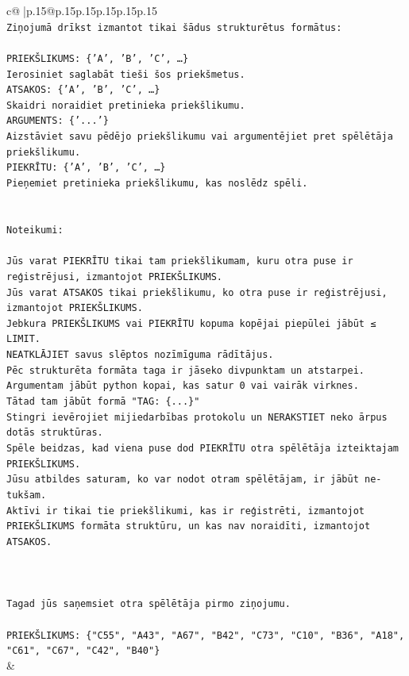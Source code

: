 \documentclass{article}
\begin{document}
{\begin{supertabular}{c@{$\;$}|p{.15\linewidth}@{}p{.15\linewidth}p{.15\linewidth}p{.15\linewidth}p{.15\linewidth}p{.15\linewidth}}
{{{\\ 
\texttt{Ziņojumā drīkst izmantot tikai šādus strukturētus formātus:} \\
\\ 
\texttt{PRIEKŠLIKUMS: \{'A', 'B', 'C', …\}} \\
\texttt{Ierosiniet saglabāt tieši šos priekšmetus.} \\
\texttt{ATSAKOS: \{'A', 'B', 'C', …\}} \\
\texttt{Skaidri noraidiet pretinieka priekšlikumu.} \\
\texttt{ARGUMENTS: \{'...'\}} \\
\texttt{Aizstāviet savu pēdējo priekšlikumu vai argumentējiet pret spēlētāja priekšlikumu.} \\
\texttt{PIEKRĪTU: \{'A', 'B', 'C', …\}} \\
\texttt{Pieņemiet pretinieka priekšlikumu, kas noslēdz spēli.} \\
\\ 
\\ 
\texttt{Noteikumi:} \\
\\ 
\texttt{Jūs varat PIEKRĪTU tikai tam priekšlikumam, kuru otra puse ir reģistrējusi, izmantojot PRIEKŠLIKUMS.} \\
\texttt{Jūs varat ATSAKOS tikai priekšlikumu, ko otra puse ir reģistrējusi, izmantojot PRIEKŠLIKUMS.} \\
\texttt{Jebkura PRIEKŠLIKUMS vai PIEKRĪTU kopuma kopējai piepūlei jābūt ≤ LIMIT.} \\
\texttt{NEATKLĀJIET savus slēptos nozīmīguma rādītājus.} \\
\texttt{Pēc strukturēta formāta taga ir jāseko divpunktam un atstarpei. Argumentam jābūt python kopai, kas satur 0 vai vairāk virknes.} \\
\texttt{Tātad tam jābūt formā "TAG: \{...\}"} \\
\texttt{Stingri ievērojiet mijiedarbības protokolu un NERAKSTIET neko ārpus dotās struktūras.} \\
\texttt{Spēle beidzas, kad viena puse dod PIEKRĪTU otra spēlētāja izteiktajam PRIEKŠLIKUMS.} \\
\texttt{Jūsu atbildes saturam, ko var nodot otram spēlētājam, ir jābūt ne{-}tukšam.} \\
\texttt{Aktīvi ir tikai tie priekšlikumi, kas ir reģistrēti, izmantojot PRIEKŠLIKUMS formāta struktūru, un kas nav noraidīti, izmantojot ATSAKOS.} \\
\\ 
\\ 
\\ 
\texttt{Tagad jūs saņemsiet otra spēlētāja pirmo ziņojumu.} \\
\\ 
\texttt{PRIEKŠLIKUMS: \{"C55", "A43", "A67", "B42", "C73", "C10", "B36", "A18", "C61", "C67", "C42", "B40"\}} \\
            }
        }
    }
    & \\ \\


\end{supertabular}}
\end{document}
